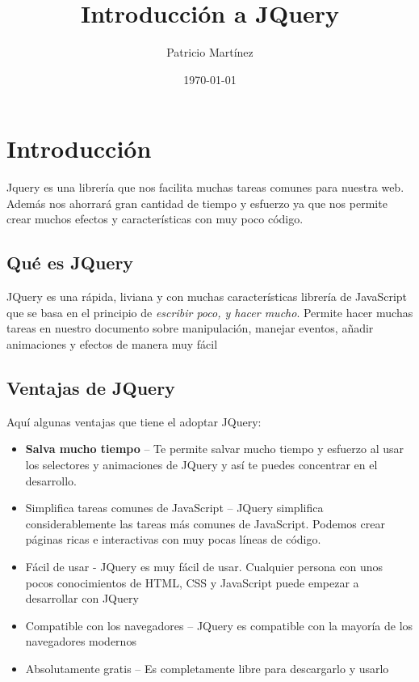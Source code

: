 \documentclass[a4paper, oneside]{article}
\author{Patricio Martínez}
\date{\today}
\title{Introducción a JQuery}
\begin{document}
\maketitle
\tableofcontents


\section{Introducción}
\label{sec:orgb6fa154}

Jquery es una librería que nos facilita muchas tareas comunes para nuestra web. Además nos ahorrará gran cantidad de tiempo y esfuerzo ya que nos permite crear muchos efectos y características con muy poco código.

\subsection{Qué es JQuery}
\label{sec:org788a71f}

JQuery es una rápida, liviana y con muchas características librería de JavaScript que se basa en el principio de \emph{escribir poco, y hacer mucho}. Permite hacer muchas tareas en nuestro documento sobre manipulación, manejar eventos, añadir animaciones y efectos de manera muy fácil

\subsection{Ventajas de JQuery}
\label{sec:orgc1cfe69}

Aquí algunas ventajas que tiene el adoptar JQuery:

\begin{itemize}
\item \textbf{Salva mucho tiempo} -- Te permite salvar mucho tiempo y esfuerzo al usar los selectores y animaciones de JQuery y así te puedes concentrar en el desarrollo.
\item Simplifica tareas comunes de JavaScript -- JQuery simplifica considerablemente las tareas más comunes de JavaScript. Podemos crear páginas ricas e interactivas con muy pocas líneas de código.
\item Fácil de usar - JQuery es muy fácil de usar. Cualquier persona con unos pocos conocimientos de HTML, CSS y JavaScript puede empezar a desarrollar con JQuery
\item Compatible con los navegadores -- JQuery es compatible con la mayoría de los navegadores modernos
\item Absolutamente gratis -- Es completamente libre para descargarlo y usarlo
\end{itemize}
\end{document}
